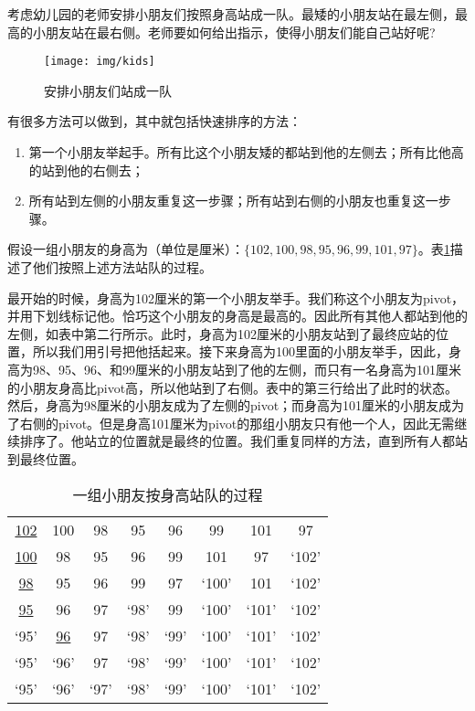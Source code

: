 \documentclass{ctexart}
\begin{document}
考虑幼儿园的老师安排小朋友们按照身高站成一队。最矮的小朋友站在最左侧，最高的小朋友站在最右侧。老师要如何给出指示，使得小朋友们能自己站好呢?

\begin{figure}[htbp]
 \centering
 \texttt{[image: img/kids]}
 \caption{安排小朋友们站成一队}
 \label{fig:knuth-ssort}
\end{figure}

有很多方法可以做到，其中就包括快速排序的方法：

\begin{enumerate}
  \item 第一个小朋友举起手。所有比这个小朋友矮的都站到他的左侧去；所有比他高的站到他的右侧去；
  \item 所有站到左侧的小朋友重复这一步骤；所有站到右侧的小朋友也重复这一步骤。
\end{enumerate}

假设一组小朋友的身高为（单位是厘米）：$\{102, 100, 98, 95, 96, 99, 101, 97\}$。表\ref{tab:kids-sort}描述了他们按照上述方法站队的过程。

最开始的时候，身高为102厘米的第一个小朋友举手。我们称这个小朋友为pivot，并用下划线标记他。恰巧这个小朋友的身高是最高的。因此所有其他人都站到他的左侧，如表中第二行所示。此时，身高为102厘米的小朋友站到了最终应站的位置，所以我们用引号把他括起来。接下来身高为100里面的小朋友举手，因此，身高为98、95、96、和99厘米的小朋友站到了他的左侧，而只有一名身高为101厘米的小朋友身高比pivot高，所以他站到了右侧。表中的第三行给出了此时的状态。然后，身高为98厘米的小朋友成为了左侧的pivot；而身高为101厘米的小朋友成为了右侧的pivot。但是身高101厘米为pivot的那组小朋友只有他一个人，因此无需继续排序了。他站立的位置就是最终的位置。我们重复同样的方法，直到所有人都站到最终位置。

\begin{table}[htbp]
\centering
\begin{tabular}{ | c c c c c c c c |}
\hline
\underline{102} & 100 & 98 & 95 & 96 & 99 & 101 & 97 \\
\underline{100} & 98 & 95 & 96 & 99 & 101 & 97 & `102' \\
\underline{98} & 95 & 96 & 99 & 97 & `100' & 101 & `102' \\
\underline{95} & 96 & 97 & `98' & 99 & `100' & `101' & `102' \\
`95' & \underline{96} & 97 & `98' & `99' & `100' & `101' & `102' \\
`95' & `96' & 97 & `98' & `99' & `100' & `101' & `102' \\
`95' & `96' & `97' & `98' & `99' & `100' & `101' & `102' \\
\hline
\end{tabular}
\caption{一组小朋友按身高站队的过程} \label{tab:kids-sort}
\end{table}
\end{document}
